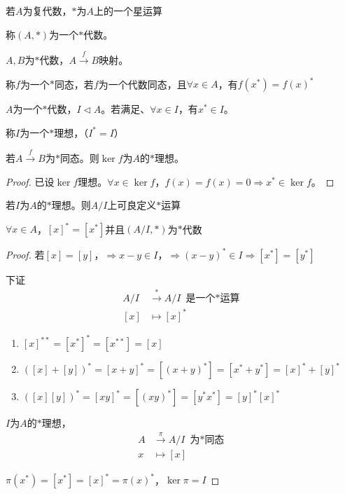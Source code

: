 \documentclass[lang=cn,a4paper,newtx,section]{elegantbook}
\begin{document}
\begin{definition}
  若$A$为复代数，$*$为$A$上的一个星运算
  
  称$(A, *)$为一个$*$代数。
\end{definition}

\begin{definition}
  $A, B$为$*$代数，$A \xrightarrow{f} B$映射。
  
  称$f$为一个$*$同态，若$f$为一个代数同态，且$\forall x \in A$，有$f(x^*) = f(x)^*$
\end{definition}

\begin{definition}
  $A$为一个$*$代数，$I \triangleleft A$。若满足、$\forall x \in I$，有$x^* \in I$。
  
  称$I$为一个$*$理想，（$I^* = I$）
\end{definition}

\begin{proposition}
  若$A \xrightarrow{f} B$为$*$同态。则$\ker f$为$A$的$*$理想。
\end{proposition}

\begin{proof}
  已设$\ker f$理想。$\forall x \in \ker f$，$f(x) = f(x) = 0 \Rightarrow x^* \in \ker f$。
\end{proof}

\begin{proposition}
  若$I$为$A$的$*$理想。则$A/I$上可良定义$*$运算
  
  $\forall x \in A$，$[x]^* = [x^*]$并且$(A/I, *)$为$*$代数
\end{proposition}

\begin{proof}
  若$[x] = [y]$，$\Rightarrow x - y \in I$，$\Rightarrow (x - y)^* \in I \Rightarrow [x^*] = [y^*]$
  
  下证
  \begin{equation*}
    \begin{aligned}
      A/I &\xrightarrow{*} A/I \text{ 是一个$*$运算} \\
      [x] &\longmapsto [x]^*
    \end{aligned}
  \end{equation*}
  
  \begin{enumerate}
    \item $[x]^{**} = [x^*]^* = [x^{**}] = [x]$
    \item $([x] + [y])^* = [x + y]^* = [(x + y)^*] = [x^* + y^*] = [x]^* + [y]^*$
    \item $([x][y])^* = [xy]^* = [(xy)^*] = [y^*x^*] = [y]^*[x]^*$
  \end{enumerate}
  
  $I$为$A$的$*$理想，
  \begin{equation*}
    \begin{aligned}
      A &\xrightarrow{\pi} A/I \text{ 为$*$同态} \\
      x &\longmapsto [x]
    \end{aligned}
  \end{equation*}
  
  $\pi(x^*) = [x^*] = [x]^* = \pi(x)^*$，$\ker \pi = I$
\end{proof}
\end{document}
